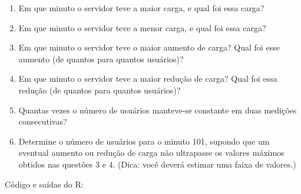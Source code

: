 \documentclass[
]{article}
\providecommand{\tightlist}{%
  \setlength{\itemsep}{0pt}\setlength{\parskip}{0pt}}
\begin{document}
\begin{enumerate}
\def\labelenumi{\arabic{enumi}.}
\tightlist
\item
  Em que minuto o servidor teve a maior carga, e qual foi essa carga?
\item
  Em que minuto o servidor teve a menor carga, e qual foi essa carga?
\item
  Em que minuto o servidor teve o maior aumento de carga? Qual foi esse
  aumento (de quantos para quantos usuários)?
\item
  Em que minuto o servidor teve a maior redução de carga? Qual foi essa
  redução (de quantos para quantos usuários)?
\item
  Quantas vezes o número de usuários manteve-se constante em duas
  medições consecutivas?
\item
  Determine o número de usuários para o minuto 101, supondo que um
  eventual aumento ou redução de carga não ultrapasse os valores máximos
  obtidos nas questões 3 e 4. (Dica: você deverá estimar uma faixa de
  valores.)
\end{enumerate}

Código e saídas do R:
\end{document}
